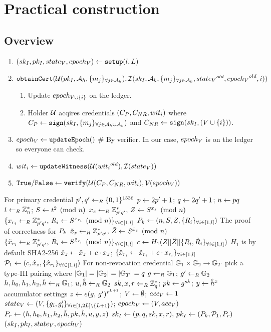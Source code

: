 \documentclass{article}
\begin{document}
\section{Practical construction}
\subsection{Overview}
\begin{enumerate}
	\item $\setupp\la \setupi$
	\item $\mt{obtainCert}(\mc{U}(pk_I, \ah, \group{m_{j}}{j}{\ah }), \mc{I}(\ski, \ak, \group{m_{j}}{j}{\ak }, \old{\stv }, \old{\epv },i))$
	\begin{enumerate}
		\item Update $\ep{\vi } $ on the ledger.
		\item Holder $\mc{U}$ acqires credentials $(C_{P}, C_{NR}, \witi )$ where $C_{P}\la \mt{sign}(\ski, \group{m_{j}}{j}{\ahk })$ and $C_{NR}\la \mt{sign}(\ski, (\vi ))$.
	\end{enumerate}
	\item $\epv \la \mt{updateEpoch}()$ \# By verifier. In our case, $\epv $ is on the ledger so everyone can check.
	\item $\witi \la \mt{updateWitness}(\mc{U}(\old{\witi }), \mc{I}(\stv ))$
	\item $\true /\false \la \mt{verify}(\mc{U}(C_{P}, C_{NR}, \witi ), \mc{V}(\epv))$
\end{enumerate}

\begin{algorithm}
\caption{$\setupi$}
\label{alg:setup}
\begin{algorithmic}
	\State \Comment For primary credential
	\State $p',q'\lar \binbits{1536}$
	\State $p\la 2p'+1$; $q\la 2q'+1$; $n\la pq$
	\State $t\lar \mbz{n}$; $\equivmod{S}{t^2}{n}$
	\State $\randexpm{x_{z}}{p'q'}{Z}{S}{n}$
	\State $\group{\randexpm{x_{r_i}}{p'q'}{R_{i}}{S}{n}}{i}{\rgpl }$
	\State $\pk \la \pkp $
	\State \Comment The proof of correctness for $\pk $
	\State $\randexpm{\td{x}_{z}}{p'q'}{\td{Z}}{S}{n}$
	\State $\group{\randexpm{\td{x}_{r_i}}{p'q'}{\td{R}_{i}}{S}{n}}{i}{\rgpl }$
	\State $c\la H_{1}(Z||\td{Z}||\group{R_i,\td{R}_i}{i}{\rgpl })$
	\Comment $H_1$ is by default SHA2-256
	\State $\zkp{x}{z}$; $\group{\zkp{x}{r_{i}}}{i}{\rgpl }$
	\State $\pl \la \plp$
	\State \Comment For non-revocation credential
	\State $\mbg{1}\times \mbg{2} \rightarrow \mbg{T}$
	\Comment pick a type-III pairing where $|\mbg{1}|=|\mbg{2}|=|\mbg{T}|=q$
	\State $g\lar \mbg{1}$; $g'\lar \mbg{2}$
	\State $h, h_0, h_1, h_2, \td{h}\lar \mbg{1}$; $u, \hat{h}\lar \mbg{2}$
	\State $sk, x, r \lar \mbz{q} $; $pk \la g^{sk}$; $y \la \hat{h}^{x}$
	\State \Comment accumulator settings
	\State $z\la \pairingexp{g}{g'}{r^{L + 1}}$; $V\la \emptyset$; $\accv \la 1$
	\State $\stv \la \stp $; $\epv \la \epp $
	\State $\pr \la \prp $
	\State $\keypairv{I}{(p, q, sk, x, r)}{\pkip }$
	\State \Return $\setupp $
\end{algorithmic}
\end{algorithm}
\end{document}
